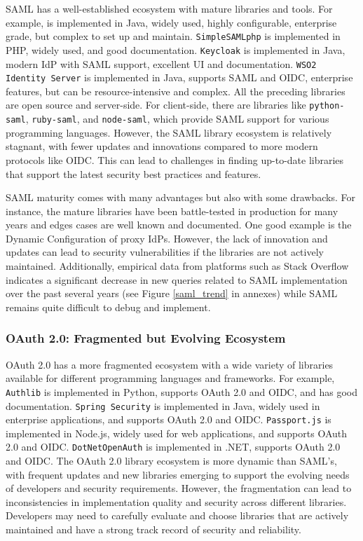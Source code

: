 \documentclass[../memoire.tex]{subfiles}
\begin{document}
SAML has a well-established ecosystem with mature libraries and tools. For example, \texttt{} is implemented in Java, widely used, highly configurable, enterprise grade, but complex to set up and maintain. \texttt{SimpleSAMLphp} is implemented in PHP, widely used, and good documentation. \texttt{Keycloak} is implemented in Java, modern IdP with SAML support, excellent UI and documentation. \texttt{WSO2 Identity Server} is implemented in Java, supports SAML and OIDC, enterprise features, but can be resource-intensive and complex. All the preceding libraries are open source and server-side. For client-side, there are libraries like \texttt{python-saml}, \texttt{ruby-saml}, and \texttt{node-saml}, which provide SAML support for various programming languages. However, the SAML library ecosystem is relatively stagnant\cite{shibboleth2024}, with fewer updates and innovations compared to more modern protocols like OIDC. This can lead to challenges in finding up-to-date libraries that support the latest security best practices and features.

SAML maturity comes with many advantages but also with some drawbacks. For instance, the mature libraries have been battle-tested in production for many years and edges cases are well known and documented. One good example is the Dynamic Configuration of proxy IdPs. However, the lack of innovation and updates can lead to security vulnerabilities if the libraries are not actively maintained. Additionally, empirical data from platforms such as Stack Overflow indicates a significant decrease in new queries related to SAML implementation over the past several years (see Figure \ref{saml_trend} in annexes) while SAML remains quite difficult to debug and implement. 

\subsubsection{OAuth 2.0: Fragmented but Evolving Ecosystem}

OAuth 2.0 has a more fragmented ecosystem with a wide variety of libraries available for different programming languages and frameworks. For example, \texttt{Authlib} is implemented in Python, supports OAuth 2.0 and OIDC, and has good documentation. \texttt{Spring Security} is implemented in Java, widely used in enterprise applications, and supports OAuth 2.0 and OIDC. \texttt{Passport.js} is implemented in Node.js, widely used for web applications, and supports OAuth 2.0 and OIDC. \texttt{DotNetOpenAuth} is implemented in .NET, supports OAuth 2.0 and OIDC. The OAuth 2.0 library ecosystem is more dynamic than SAML's, with frequent updates and new libraries emerging to support the evolving needs of developers and security requirements. However, the fragmentation can lead to inconsistencies in implementation quality and security across different libraries. Developers may need to carefully evaluate and choose libraries that are actively maintained and have a strong track record of security and reliability.
\end{document}
